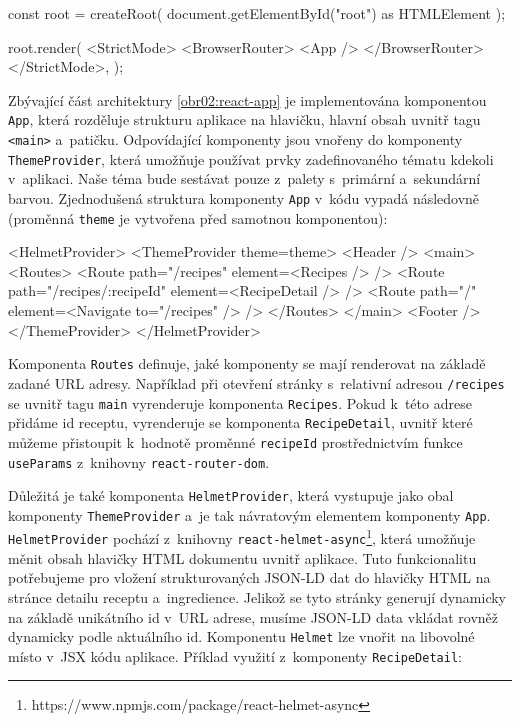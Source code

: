 \begingroup
\samepage
\begin{code}
const root = createRoot(
    document.getElementById("root") as HTMLElement
);

root.render(
  <StrictMode>
    <BrowserRouter>
      <App />
    </BrowserRouter>
  </StrictMode>,
);
\end{code}
\endgroup

Zbývající část architektury \ref{obr02:react-app} je implementována komponentou \texttt{App}, která rozděluje strukturu aplikace na hlavičku, hlavní obsah uvnitř tagu \texttt{<main>} a~patičku. Odpovídající komponenty jsou vnořeny do komponenty \texttt{ThemeProvider}, která umožňuje používat prvky zadefinovaného tématu kdekoli v~aplikaci. Naše téma bude sestávat pouze z~palety s~primární a~sekundární barvou. Zjednodušená struktura komponenty \texttt{App} v~kódu vypadá následovně (proměnná \texttt{theme} je vytvořena před samotnou komponentou):

\begingroup
\samepage
\begin{code}
<HelmetProvider>
  <ThemeProvider theme={theme}>
    <Header />
    <main>
      <Routes>
        <Route path="/recipes" element={<Recipes />} />
        <Route path="/recipes/:recipeId" element={<RecipeDetail />} />
        <Route path="/" element={<Navigate to="/recipes" />} />
      </Routes>
    </main>
    <Footer />
  </ThemeProvider>
</HelmetProvider>
\end{code}
\endgroup

Komponenta \texttt{Routes} definuje, jaké komponenty se mají renderovat na základě zadané URL adresy. Například při otevření stránky s~relativní adresou \texttt{/recipes} se uvnitř tagu \texttt{main} vyrenderuje komponenta \texttt{Recipes}. Pokud k~této adrese přidáme id receptu, vyrenderuje se komponenta \texttt{RecipeDetail}, uvnitř které můžeme přistoupit k~hodnotě proměnné \texttt{recipeId} prostřednictvím funkce \texttt{useParams} z~knihovny \texttt{react-router-dom}.

Důležitá je také komponenta \texttt{HelmetProvider}, která vystupuje jako obal komponenty \texttt{ThemeProvider} a~je tak návratovým elementem komponenty \texttt{App}. \texttt{HelmetProvider} pochází z~knihovny \texttt{react-helmet-async}\footnote{https://www.npmjs.com/package/react-helmet-async}, která umožňuje měnit obsah hlavičky HTML dokumentu uvnitř aplikace. Tuto funkcionalitu potřebujeme pro vložení strukturovaných JSON-LD dat do hlavičky HTML na stránce detailu receptu a~ingredience. Jelikož se tyto stránky generují dynamicky na základě unikátního id v~URL adrese, musíme JSON-LD data vkládat rovněž dynamicky podle aktuálního id. Komponentu \texttt{Helmet} lze vnořit na libovolné místo v~JSX kódu aplikace. Příklad využití z~komponenty \texttt{RecipeDetail}:

